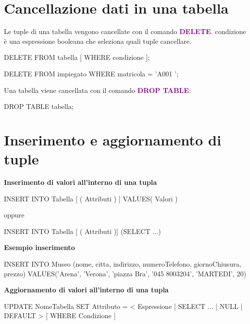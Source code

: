 \section{Cancellazione dati in una tabella}
Le tuple di una tabella vengono cancellate con il comando \textcolor{purple}{\textbf{DELETE}}.
condizione è una espressione booleana che seleziona quali tuple cancellare. 
\begin{codiceSQL}
  DELETE FROM tabella [ WHERE condizione ];
\end{codiceSQL}

\begin{codiceSQL}
  DELETE FROM impiegato WHERE matricola = 'A001 ';
\end{codiceSQL}

Una tabella viene cancellata con il comando \textcolor{purple}{\textbf{DROP TABLE}}:
\begin{codiceSQL}
  DROP TABLE tabella;
\end{codiceSQL}




\section{Inserimento e aggiornamento di tuple}

\textbf{\large Inserimento di valori all'interno di una tupla}

\begin{codiceSQL}
INSERT INTO Tabella [ ( Attributi ) ] 
VALUES( Valori ) 
\end{codiceSQL}
oppure
\begin{codiceSQL}
  INSERT INTO Tabella [ ( Attributi )]
(SELECT ...)
\end{codiceSQL}

\textbf{ Esempio inserimento}
\begin{codiceSQL}
INSERT INTO Museo (nome, citta, indirizzo, numeroTelefono, giornoChiusura, prezzo)
VALUES('Arena', 'Verona', 'piazza Bra', '045 8003204', 'MARTEDI', 20) 

\end{codiceSQL}


\textbf{\large Aggiornamento di valori all'interno di una tupla}

\begin{codiceSQL}
UPDATE NomeTabella
  SET Attributo = < 
  Espressione |
  SELECT ... | 
  NULL | 
  DEFAULT >
  [ WHERE Condizione ]
\end{codiceSQL}

